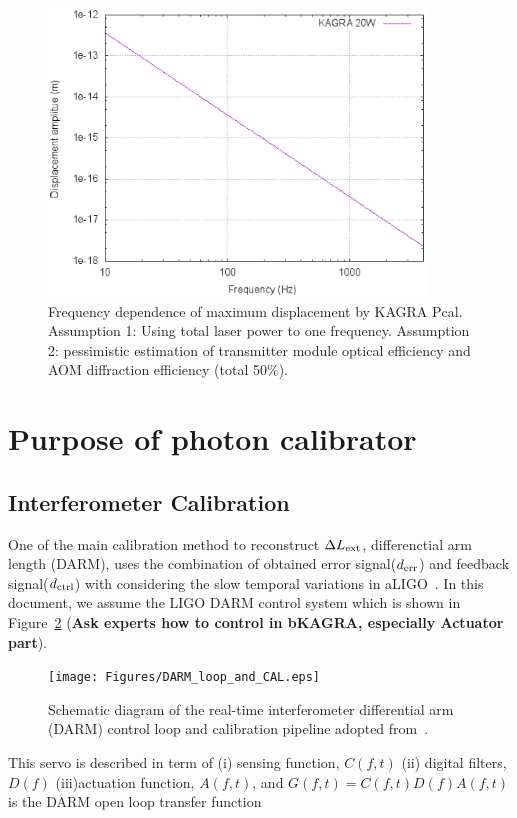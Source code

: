 \begin{figure}
\begin{center}
\includegraphics[width=10cm]{Figures/pcal_disp.eps}
\caption{Frequency dependence of maximum displacement by KAGRA Pcal. 
Assumption 1: Using total laser power to one frequency.
Assumption 2: pessimistic estimation of transmitter module optical efficiency and 
AOM diffraction efficiency (total 50$\%$). }
\label{fig:kagra_pcal_displacement} 
\end{center}
\end{figure}

 

\section{Purpose of photon calibrator}
\subsection{Interferometer Calibration}\label{sec:darm_calib}

One of the main calibration method to reconstruct $\Delta L_{\rm ext}$, differenctial arm length (DARM), 
uses the combination of obtained error signal($d_{\rm err}$) and feedback signal($d_{\rm ctrl}$) 
with considering the slow temporal variations in 
aLIGO~\cite{LIGO-CAL,Tuyenbayev}.
In this document, we assume the LIGO DARM control system which is shown in Figure~\ref{fig:L_DARM_control_loop}
({\bf Ask experts how to control in bKAGRA, especially Actuator part}). 
\begin{figure}
\begin{center}
\texttt{[image: Figures/DARM\_loop\_and\_CAL.eps]}
\caption{Schematic diagram of the real-time interferometer differential 
arm (DARM) control loop and calibration pipeline adopted 
from~\cite{LIGO-CAL,Tuyenbayev}.}
\label{fig:L_DARM_control_loop} 
\end{center}
\end{figure}
This servo is described in term of 
(i) sensing function, $C(f,t)$ 
(ii) digital filters, $D(f)$ 
(iii)actuation function, $A(f,t)$, 
and $G(f,t) = C(f,t)D(f)A(f,t)$ is the DARM open loop transfer function  

